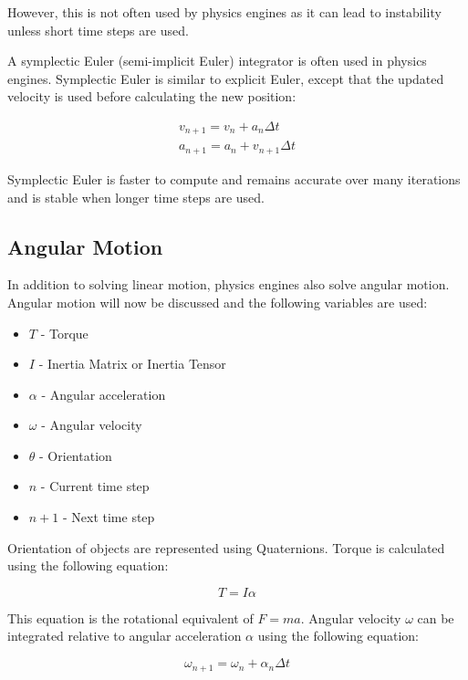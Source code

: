 However, this is not often used by physics engines as it can lead to instability unless short time steps are used.

A symplectic Euler (semi-implicit Euler) integrator is often used in physics engines. Symplectic Euler is similar to explicit Euler, except that the updated velocity is used before calculating the new position:

\begin{equation}
\begin{split}
	v_{n+1}=v_n+a_n{\Delta}t\\
	a_{n+1}=a_n+v_{n+1}{\Delta}t
\end{split}
\end{equation}

Symplectic Euler is faster to compute and remains accurate over many iterations and is stable when longer time steps are used.

\subsection{Angular Motion}
In addition to solving linear motion, physics engines also solve angular motion. Angular motion will now be discussed and the following variables are used:
\begin{itemize}
	\item $T$ - Torque
	\item $I$ - Inertia Matrix or Inertia Tensor
	\item $\alpha$ - Angular acceleration
	\item $\omega$ - Angular velocity
	\item $\theta$ - Orientation
	\item $n$ - Current time step
	\item $n+1$ - Next time step
\end{itemize}

Orientation of objects are represented using Quaternions. Torque is calculated using the following equation:

\begin{equation}
T=I\alpha
\end{equation}

This equation is the rotational equivalent of $F=ma$.
Angular velocity $\omega$ can be integrated relative to angular acceleration $\alpha$ using the following equation:

\begin{equation}
\omega_{n+1}=\omega_n+\alpha_n\Delta t
\end{equation}

